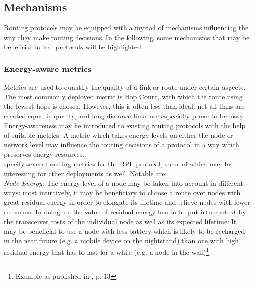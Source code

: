 \subsection{Mechanisms}
\label{subsec:appr_mechanisms}
Routing protocols may be equipped with a myriad of mechanisms influencing the way they make routing decisions. In the following, some mechanisms that may be beneficial to IoT protocols will be highlighted.

\subsubsection{Energy-aware metrics}
\label{subsec:appr_mechanisms_metrics}
Metrics are used to quantify the quality of a link or route under certain aspects.
The most commonly deployed metric is Hop Count, with which the route using the fewest hops is chosen. However, this is often less than ideal: not all links are created equal in quality, and long-distance links are especially prone to be lossy.
Energy-awareness may be introduced to existing routing protocols with the help of suitable metrics. A metric which takes energy levels on either the node or network level may influence the routing decisions of a protocol in a way which preserves energy resources.\\
\cite{rfc6551} specify several routing metrics for the \gls{RPL} protocol, some of which may be interesting for other deployments as well. Notable are:\\
\emph{Node Energy:} The energy level of a node may be taken into account in different ways: most intuitively, it may be beneficiary to choose a route over nodes with great residual energy in order to elongate its lifetime and relieve nodes with fewer resources. In doing so, the value of residual energy has to be put into context by the transceiver costs of the individual node as well as its expected lifetime: It may be beneficial to use a node with less battery which is likely to be recharged in the near future (e.g. a mobile device on the nightstand) than one with high residual energy that has to last for a while (e.g. a node in the wall)\footnote{Example as published in \cite{rfc6551}, p. 13}. \\
